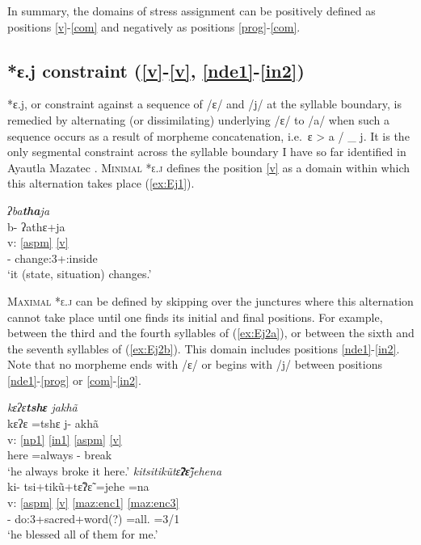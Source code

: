 \documentclass[output=paper]{langscibook}
\begin{document}
In summary, the domains of stress assignment can be positively defined as positions \ref{v}-\ref{com} and negatively as positions \ref{prog}-\ref{com}.

\subsection{*ɛ.j constraint (\ref{v}-\ref{v}, \ref{nde1}-\ref{in2})}\label{sec:d:Ej}
*ɛ.j, or constraint against a sequence of /ɛ/ and /j/ at the syllable boundary, is remedied by alternating (or dissimilating) underlying /ɛ/ to /a/ when such a sequence occurs as a result of morpheme concatenation, i.e.~ɛ > a / \_ j. It is the only segmental constraint across the syllable boundary I have so far identified in Ayautla Mazatec \citep[97--98]{nakamoto20}. \textsc{Minimal *ɛ.j} defines the position \ref{v} as a domain within which this alternation takes place (\ref{ex:Ej1}).

\ea \label{ex:Ej1} \textit{ʔba\2\textbf{\ssn{}tha\4}\st{}ja\2}\\
\glll {} b- ʔa\2\ssn{}thɛ\4+ja\2\\
v: \ref{aspm} \ref{v}\\
{} \Hab- change:3+\Pos:inside\\
\glt `it (state, situation) changes.'
\z

\textsc{Maximal *ɛ.j} can be defined by skipping over the junctures where this alternation cannot take place until one finds its initial and final positions. For example, between the third and the fourth syllables of (\ref{ex:Ej2a}), or between the sixth and the seventh syllables of (\ref{ex:Ej2b}). This domain includes positions \ref{nde1}-\ref{in2}. Note that no morpheme ends with /ɛ/ or begins with /j/ between positions \ref{nde1}-\ref{prog} or \ref{com}-\ref{in2}.

\ea \label{ex:Ej2}
\ea \label{ex:Ej2a} \textit{\ssn{}kɛ\2\st{}ʔɛ\1\textbf{\ssn{}tshɛ\4} ja\2\st{}khã\4}\\
\glll {} \ssn{}kɛ\2ʔɛ\1 =\ssn{}tshɛ\4 j- a\2khã\4\\
v: \ref{np1} \ref{in1} \ref{aspm} \ref{v}\\
{} here =always \Pfv- break\\
\glt `he always broke it here.'
\ex\label{ex:Ej2b} \textit{ki\2tsi\2t\xy{}i\2kũ\2tɛ̃\2\textbf{ʔɛ̃\2\3}je\2he\2na\1}\\
\glll {} ki\2- tsi\2+t\xy{}i\2kũ\2+tɛ̃\2ʔɛ̃\2\3 =je\2he\2 =na\1\\
v: \ref{aspm} \ref{v} \ref{maz:enc1} \ref{maz:enc3}\\
{} \Pfv- do:3+sacred+word(?) =all.\Inan{} =3/1\Sg\\
\glt `he blessed all of them for me.'
\z
\z 
\end{document}
